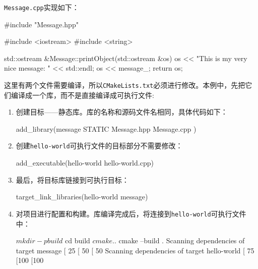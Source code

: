 \texttt{Message.cpp}实现如下：

\begin{codebox}[cpp]
#include "Message.hpp"

#include <iostream>
#include <string>

std::ostream &Message::printObject(std::ostream &os) {
  os << "This is my very nice message: " << std::endl;
  os << message_;
  return os;
}
\end{codebox}


这里有两个文件需要编译，所以\texttt{CMakeLists.txt}必须进行修改。本例中，先把它们编译成一个库，而不是直接编译成可执行文件:

\begin{enumerate}
\item 创建目标——静态库。库的名称和源码文件名相同，具体代码如下：

\begin{codebox}[cmake]
add_library(message
  STATIC
    Message.hpp
    Message.cpp
  )
\end{codebox}

\item 创建\texttt{hello-world}可执行文件的目标部分不需要修改：

\begin{codebox}[cmake]
add_executable(hello-world hello-world.cpp)
\end{codebox}

\item 最后，将目标库链接到可执行目标：

\begin{codebox}[cmake]
target_link_libraries(hello-world message)
\end{codebox}

\item 对项目进行配置和构建。库编译完成后，将连接到\texttt{hello-world}可执行文件中：

\begin{codebox}[shell]
$ mkdir -p build
$ cd build
$ cmake ..
$ cmake --build .
Scanning dependencies of target message
[ 25%
[ 50%
[ 50%
Scanning dependencies of target hello-world
[ 75%
[100%
[100%
\end{codebox}


\end{enumerate}

